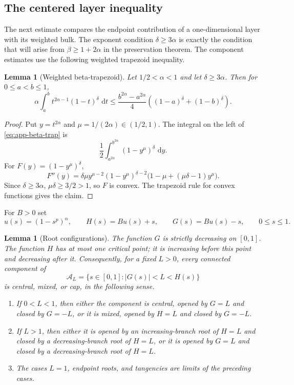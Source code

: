 \documentclass[pdflatex,sn-mathphys-num]{sn-jnl}
\numberwithin{equation}{section}
\theoremstyle{thmstyleone}
\newtheorem{lemma}[theorem]{Lemma}
\theoremstyle{thmstylethree}
\newcommand{\1}{\mathbf{1}}
\newcommand{\dd}{\,\mathrm{d}}
\begin{document}
\subsection{The centered layer inequality}

The next estimate compares the endpoint contribution of a one-dimensional
layer with its weighted bulk. The exponent condition
$\delta\ge3\alpha$ is exactly the condition that will arise from
$\beta\ge1+2\alpha$ in the preservation theorem. The component
estimates use the following weighted trapezoid inequality.

\begin{lemma}[Weighted beta-trapezoid]\label{lem:app-beta-trap}
Let $1/2<\alpha<1$ and let $\delta\ge3\alpha$. Then for $0\le a<b\le1$,
\begin{equation}\label{eq:app-beta-trap}
 \alpha\int_a^b t^{2\alpha-1}(1-t)^\delta\,\dd t
 \le
 \frac{b^{2\alpha}-a^{2\alpha}}4\left((1-a)^\delta+(1-b)^\delta\right).
\end{equation}
\end{lemma}

\begin{proof}
Put $y=t^{2\alpha}$ and $\mu=1/(2\alpha)\in(1/2,1)$. The integral on the left of \eqref{eq:app-beta-trap} is
\[
 \frac12\int_{a^{2\alpha}}^{b^{2\alpha}}(1-y^\mu)^\delta\,\dd y.
\]
For $F(y)=(1-y^\mu)^\delta$,
\[
 F''(y)=\delta\mu y^{\mu-2}(1-y^\mu)^{\delta-2}\bigl(1-\mu+(\mu\delta-1)y^\mu\bigr).
\]
Since $\delta\ge3\alpha$, $\mu\delta\ge3/2>1$, so $F$ is convex. The trapezoid rule for convex functions gives the claim.
\end{proof}

For $B>0$ set
\[
 u(s)=(1-s^p)^\alpha,
 \qquad
 H(s)=Bu(s)+s,
 \qquad
 G(s)=Bu(s)-s,
 \qquad 0\le s\le1.
\]

\begin{lemma}[Root configurations]\label{lem:app-root-config}
The function $G$ is strictly decreasing on $[0,1]$. The function $H$ has at most one critical point; it is increasing before this point and decreasing after it. Consequently, for a fixed $L>0$, every connected component of
\[
 \mathcal A_L=\{s\in[0,1]: |G(s)|<L<H(s)\}
\]
is central, mixed, or cap, in the following sense.
\begin{enumerate}[label=(\roman*),leftmargin=2em]
\item If $0<L<1$, then either the component is central, opened by $G=L$ and closed by $G=-L$, or it is mixed, opened by $H=L$ and closed by $G=-L$.
\item If $L>1$, then either it is opened by an increasing-branch root of $H=L$ and closed by a decreasing-branch root of $H=L$, or it is opened by $G=L$ and closed by a decreasing-branch root of $H=L$.
\item The cases $L=1$, endpoint roots, and tangencies are limits of the preceding cases.
\end{enumerate}
\end{lemma}
\end{document}

